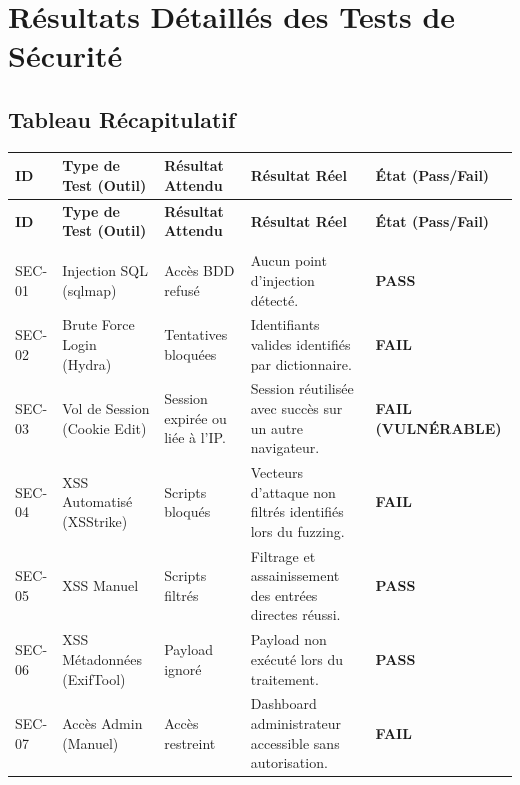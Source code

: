 \documentclass[a4paper,12pt]{article}
\newcommand{\important}[1]{\textcolor{importantred}{\textbf{#1}}}
\newcommand{\protege}[1]{\textcolor{protegegreen}{\textbf{#1}}}
\begin{document}
    \section{Résultats Détaillés des Tests de Sécurité}

    \subsection{Tableau Récapitulatif}

    \begin{longtable}{|>{\centering\arraybackslash}p{1.2cm}|>{\raggedright\arraybackslash}p{3.5cm}|>{\raggedright\arraybackslash}p{3.5cm}|>{\raggedright\arraybackslash}p{3.5cm}|>{\centering\arraybackslash}p{2.5cm}|}
    \hline
    \rowcolor{lightgray}
    \textbf{ID} & \textbf{Type de Test (Outil)} & \textbf{Résultat Attendu} & \textbf{Résultat Réel} & \textbf{État (Pass/Fail)} \\
    \hline
    \endfirsthead
    \hline
    \rowcolor{lightgray}
    \textbf{ID} & \textbf{Type de Test (Outil)} & \textbf{Résultat Attendu} & \textbf{Résultat Réel} & \textbf{État (Pass/Fail)} \\
    \hline
    \endhead
    \hline
    \multicolumn{5}{r}{\textit{Suite page suivante...}} \\
    \endfoot
    \hline
    \endlastfoot
    SEC-01 & Injection SQL (sqlmap) & Accès BDD refusé & Aucun point d'injection détecté. & \protege{PASS} \\
    \hline
    SEC-02 & Brute Force Login (Hydra) & Tentatives bloquées & Identifiants valides identifiés par dictionnaire. & \important{FAIL} \\
    \hline
    SEC-03 & Vol de Session (Cookie Edit) & Session expirée ou liée à l'IP. & Session réutilisée avec succès sur un autre navigateur. & \important{FAIL (VULNÉRABLE)} \\
    \hline
    SEC-04 & XSS Automatisé (XSStrike) & Scripts bloqués & Vecteurs d'attaque non filtrés identifiés lors du fuzzing. & \important{FAIL} \\
    \hline
    SEC-05 & XSS Manuel & Scripts filtrés & Filtrage et assainissement des entrées directes réussi. & \protege{PASS} \\
    \hline
    SEC-06 & XSS Métadonnées (ExifTool) & Payload ignoré & Payload non exécuté lors du traitement. & \protege{PASS} \\
    \hline
    SEC-07 & Accès Admin (Manuel) & Accès restreint & Dashboard administrateur accessible sans autorisation. & \important{FAIL} \\
    \hline
    \end{longtable}
\end{document}
